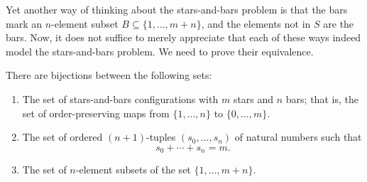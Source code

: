 Yet another way of thinking about the stars-and-bars problem is that the bars mark an $n$-element subset $B\subseteq \{1,\ldots,m+n\}$, and the elements not in $S$ are the bars. Now, it does not suffice to merely appreciate that each of these ways indeed model the stars-and-bars problem. We need to prove their equivalence.

\begin{theorem}\label{theorem:stars-and-bars}
  There are bijections between the following sets:
  \begin{enumerate}
  \item The set of stars-and-bars configurations with $m$ stars and $n$ bars; that is, the set of order-preserving maps from $\{1,\ldots,n\}$ to $\{0,\ldots,m\}$.
  \item The set of ordered $(n+1)$-tuples $(s_0,\ldots,s_n)$ of natural numbers such that
    \begin{equation*}
      s_0+\cdots+s_n=m.
    \end{equation*}
  \item The set of $n$-element subsets of the set $\{1,\ldots,m+n\}$.
  \end{enumerate}
\end{theorem}

